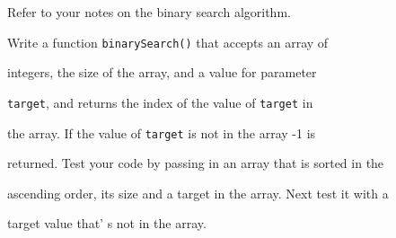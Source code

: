 Refer to your notes on the binary search algorithm.

Write a function \texttt{binarySearch()} that accepts an array of

integers, the size of the array, and a value for parameter

\texttt{target}, and returns the index of the value of \texttt{target} in

the array. If the value of \texttt{target} is not in the array -1 is

returned. Test your code by passing in an array that is sorted in the

ascending order, its size and a target in the array. Next test it with a

target value that' s not in the array.

